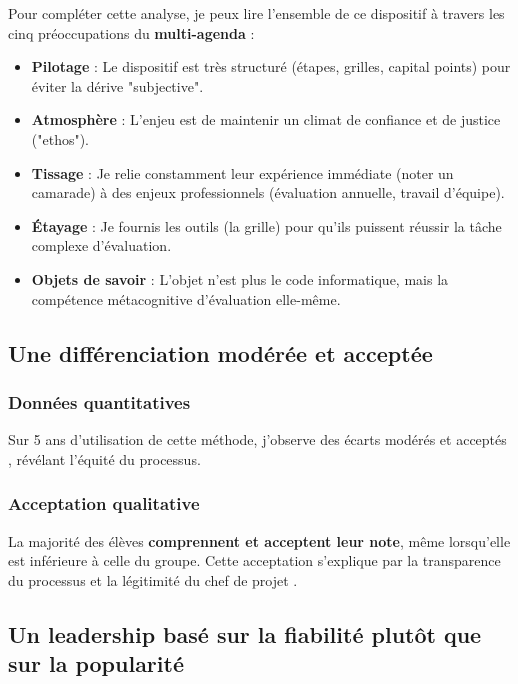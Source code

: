 Pour compléter cette analyse, je peux lire l'ensemble de ce dispositif à travers les cinq préoccupations du \textbf{multi-agenda} \parencite{bucheton_postures} :
\begin{itemize}[leftmargin=*]
    \item \textbf{Pilotage} : Le dispositif est très structuré (étapes, grilles, capital points) pour éviter la dérive "subjective".
    \item \textbf{Atmosphère} : L'enjeu est de maintenir un climat de confiance et de justice ("ethos").
    \item \textbf{Tissage} : Je relie constamment leur expérience immédiate (noter un camarade) à des enjeux professionnels (évaluation annuelle, travail d'équipe).
    \item \textbf{Étayage} : Je fournis les outils (la grille) pour qu'ils puissent réussir la tâche complexe d'évaluation.
    \item \textbf{Objets de savoir} : L'objet n'est plus le code informatique, mais la compétence métacognitive d'évaluation elle-même.
\end{itemize}

\subsection{Une différenciation modérée et acceptée}

\subsubsection{Données quantitatives}

Sur 5 ans d'utilisation de cette méthode, j'observe des écarts modérés et acceptés \parencite{evaluation_pairs_univ_poitiers}, révélant l'équité du processus.

\subsubsection{Acceptation qualitative}

La majorité des élèves \textbf{comprennent et acceptent leur note}, même lorsqu'elle est inférieure à celle du groupe. Cette acceptation s'explique par la transparence du processus et la légitimité du chef de projet \parencite{evaluation_formative}.

\subsection{Un leadership basé sur la fiabilité plutôt que sur la popularité}

